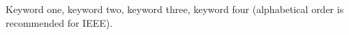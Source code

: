 \begin{abstract}
Write a concise, self-contained abstract here (about 150--250 words).
State the problem, your approach/contribution, the key method, and the
main quantitative results. Avoid citations and undefined acronyms.
\end{abstract}

\begin{keywords}
Keyword one, keyword two, keyword three, keyword four (alphabetical
order is recommended for IEEE).
\end{keywords}
